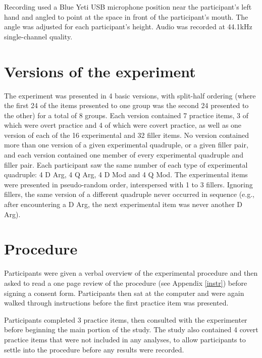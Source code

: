 \documentclass[12pt,oneside]{book}
\begin{document}
Recording used a Blue Yeti USB microphone position near the participant's left hand and angled to point at the space in front of the participant's mouth. The angle was adjusted for each participant's height. Audio was recorded at 44.1kHz single-channel quality.

\hypertarget{versions-of-the-experiment}{%
\section{Versions of the experiment}\label{versions-of-the-experiment}}

The experiment was presented in 4 basic versions, with split-half ordering (where the first 24 of the items presented to one group was the second 24 presented to the other) for a total of 8 groups. Each version contained 7 practice items, 3 of which were overt practice and 4 of which were covert practice, as well as one version of each of the 16 experimental and 32 filler items. No version contained more than one version of a given experimental quadruple, or a given filler pair, and each version contained one member of every experimental quadruple and filler pair. Each participant saw the same number of each type of experimental quadruple: 4 D Arg, 4 Q Arg, 4 D Mod and 4 Q Mod. The experimental items were presented in pseudo-random order, interspersed with 1 to 3 fillers. Ignoring fillers, the same version of a different quadruple never occurred in sequence (e.g., after encountering a D Arg, the next experimental item was never another D Arg).

\hypertarget{procedure}{%
\section{Procedure}\label{procedure}}

Participants were given a verbal overview of the experimental procedure and then asked to read a one page review of the procedure (see Appendix \ref{instr}) before signing a consent form. Participants then sat at the computer and were again walked through instructions before the first practice item was presented. 

Participants completed 3 practice items, then consulted with the experimenter before beginning the main portion of the study. The study also contained 4 covert practice items that were not included in any analyses, to allow participants to settle into the procedure before any results were recorded.
\end{document}
